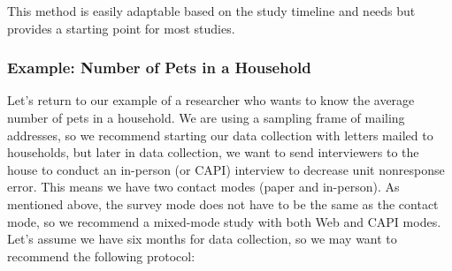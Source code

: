 \documentclass[
]{krantz}
\begin{document}
This method is easily adaptable based on the study timeline and needs but provides a starting point for most studies.

\hypertarget{overview-design-dcplanning-ex}{%
\subsubsection*{Example: Number of Pets in a Household}\label{overview-design-dcplanning-ex}}


Let's return to our example of a researcher who wants to know the average number of pets in a household. We are using a sampling frame of mailing addresses, so we recommend starting our data collection with letters mailed to households, but later in data collection, we want to send interviewers to the house to conduct an in-person (or CAPI) interview to decrease unit nonresponse error. This means we have two contact modes (paper and in-person). As mentioned above, the survey mode does not have to be the same as the contact mode, so we recommend a mixed-mode study with both Web and CAPI modes. Let's assume we have six months for data collection, so we may want to recommend the following protocol:
\end{document}
